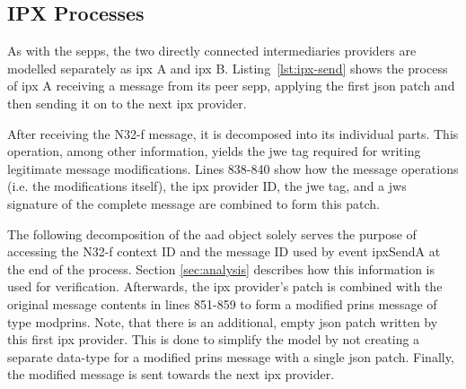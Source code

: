 \subsection{IPX Processes}

As with the \glspl{sepp}, the two directly connected intermediaries providers are modelled separately as \gls{ipx} A and \gls{ipx} B.
Listing~\ref{lst:ipx-send} shows the process of \gls{ipx} A receiving a message from its peer \gls{sepp}, applying the first \gls{json} patch and then sending it on to the next \gls{ipx} provider.

After receiving the N32-f message, it is decomposed into its individual parts.
This operation, among other information, yields the \gls{jwe} tag required for writing legitimate message modifications.
Lines 838-840 show how the message operations (i.e. the modifications itself), the \gls{ipx} provider ID, the \gls{jwe} tag, and a \gls{jws} signature of the complete message are combined to form this patch.

The following decomposition of the \gls{aad} object solely serves the purpose of accessing the N32-f context ID and the message ID used by event {\sffamily ipxSendA} at the end of the process.
Section \ref{sec:analysis} describes how this information is used for verification.
Afterwards, the \gls{ipx} provider's patch is combined with the original message contents in lines 851-859 to form a modified \gls{prins} message of type {\sffamily modprins}.
Note, that there is an additional, empty \gls{json} patch written by this first \gls{ipx} provider.
This is done to simplify the model by not creating a separate data-type for a modified \gls{prins} message with a single \gls{json} patch.
Finally, the modified message is sent towards the next \gls{ipx} provider.

